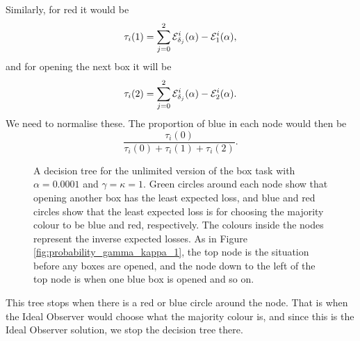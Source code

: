 Similarly, for red it would be
\begin{equation*}
    \tau_i(1) = \sum_{j=0}^2 \mathcal{E}_{\delta_j}^i(\alpha) - \mathcal{E}_1^i(\alpha),
\end{equation*}
and for opening the next box it will be
\begin{equation*}
    \tau_i(2) = \sum_{j=0}^2 \mathcal{E}_{\delta_j}^i(\alpha) - \mathcal{E}_2^i(\alpha).
\end{equation*}
We need to normalise these. The proportion of blue in each node would then be
\begin{equation*}
    \frac{\tau_i(0)}{\tau_i(0)+\tau_i(1)+\tau_i(2)}.
\end{equation*}
\begin{figure}
    \centering
    \scalebox{0.7}{}
    \caption[IO solution, unlimited. $\alpha=0.0001$, $\gamma=\kappa=1$]{A decision tree for the unlimited version of the box task with $\alpha = 0.0001$ and $\gamma=\kappa=1$. Green circles around each node show that opening another box has the least expected loss, and blue and red circles show that the least expected loss is for choosing the majority colour to be blue and red, respectively. The colours inside the nodes represent the inverse expected losses. As in Figure \ref{fig:probability_gamma_kappa_1}, the top node is the situation before any boxes are opened, and the node down to the left of the top node is when one blue box is opened and so on.}
    \label{fig:unlim_a0.0001_gk1}
\end{figure}
This tree stops when there is a red or blue circle around the node. That is when the Ideal Observer would choose what the majority colour is, and since this is the Ideal Observer solution, we stop the decision tree there. 


